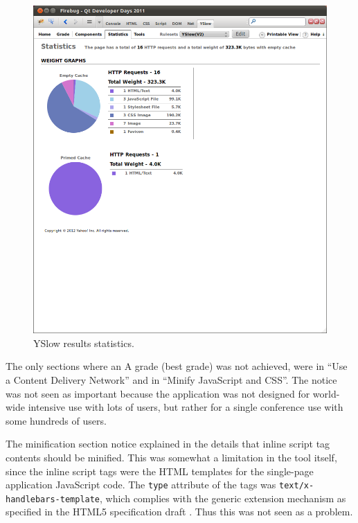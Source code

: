 \begin{figure}[h!]
  \begin{center}
    \includegraphics[width=\textwidth]{images/yslow-v2-statistics.png}
    \caption{YSlow results statistics.}
    \label{figure:yslow-v2-statistics.png}
  \end{center}
\end{figure}

The only sections where an A grade (best grade) was not achieved, were
in ``Use a Content Delivery Network'' and in ``Minify JavaScript and
CSS''. The  notice was not seen as important because the
application was not designed for world-wide intensive use with lots of
users, but rather for a single conference use with some hundreds of
users.

The minification section notice explained in the details that inline
script tag contents should be minified. This was somewhat a limitation
in the tool itself, since the inline script tags were the HTML
templates for the single-page application JavaScript code. The
\texttt{type} attribute of the tags was
\texttt{text/x-handlebars-template}, which complies with the generic
extension mechanism as specified in the HTML5 specification draft
\cite{HTML5draft}. Thus this was not seen as a problem.

